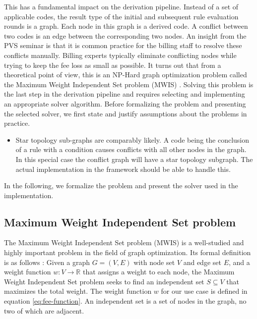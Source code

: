 This has a fundamental impact on the derivation pipeline.
Instead of a set of applicable codes, the result type of the initial and subsequent rule evaluation rounds is a graph.
Each node in this graph is a derived code.
A conflict between two codes is an edge between the corresponding two nodes.
An insight from the PVS seminar is that it is common practice for the billing staff to resolve these conflicts manually.
Billing experts typically eliminate conflicting nodes while trying to keep the fee loss as small as possible.
It turns out that from a theoretical point of view, this is an NP-Hard graph optimization problem called the Maximum Weight Independent Set problem (MWIS) \cite{SAKAI2003313}.
Solving this problem is the last step in the derivation pipeline and requires selecting and implementing an appropriate solver algorithm.
Before formalizing the problem and presenting the selected solver, we first state and justify assumptions about the problems in practice.
\begin{itemize}
    The occurring MWIS problems are comparably simple.
    This is inherently the case because, in traditional medical billing, medical staff resolves those conflict issues by hand.
    Most nodes are unlikely to be part of a conflict.
    This means that most nodes in an average result graph are remote nodes the solver can effectively ignore.
    This is due to the reason that codes that explicitly exclude themselves
    using the  condition type are likely to logically exclude themselves in the  block.
    \item Star topology sub-graphs are comparably likely.
    A code being the conclusion of a rule with a condition  causes conflicts with all other nodes in the graph.
    In this special case the conflict graph will have a star topology subgraph.
    The actual implementation in the framework should be able to handle this.
\end{itemize}
In the following, we formalize the problem and present the solver used in the implementation.

\subsection{Maximum Weight Independent Set problem}\label{subsec:maximum-weight-independent-set-problem}
The Maximum Weight Independent Set problem (MWIS)
is a well-studied and highly important problem in the field of graph optimization.
Its formal definition is as follows \cite{SAKAI2003313}:
Given a graph $G = (V, E)$ with node set $V$ and edge set $E$,
and a weight function $w: V \rightarrow \mathbb{R}$ that assigns a weight to each node,
the Maximum Weight Independent Set problem seeks
to find an independent set $S \subseteq V$ that maximizes the total weight.
The weight function $w$ for our use case is defined in equation \ref{eq:fee-function}.
An independent set is a set of nodes in the graph, no two of which are adjacent.

